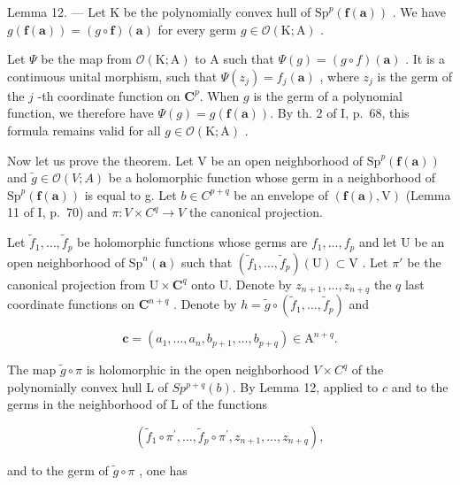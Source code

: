 Lemma 12. --- Let K be the polynomially convex hull of \(\mathrm{Sp}^p (\pmb {f}(\pmb {a}))\) . We have \(g(\pmb {f}(\pmb {a})) = (g\circ \pmb {f})(\pmb {a})\) for every germ \(g\in \mathcal{O}(\mathrm{K};\mathrm{A})\) .

Let \(\Psi\) be the map from \(\mathcal{O}(\mathrm{K};\mathrm{A})\) to A such that \(\Psi(g) = (g\circ f)(\boldsymbol{a})\) . It is a continuous unital morphism, such that \(\Psi(z_j) = f_j(\boldsymbol{a})\) , where \(z_{j}\) is the germ of the \(j\) -th coordinate function on \(\mathbf{C}^p\). When \(g\) is the germ of a polynomial function, we therefore have \(\Psi(g) = g(\boldsymbol{f}(\boldsymbol{a}))\). By th. 2 of I, p.~68, this formula remains valid for all \(g\in \mathcal{O}(\mathrm{K};\mathrm{A})\) .

Now let us prove the theorem. Let V be an open neighborhood of \(\mathrm{Sp}^{p}(\boldsymbol{f}(\boldsymbol{a}))\) and \(\widetilde{g}\in\mathcal{O}(V;A)\) be a holomorphic function whose germ in a neighborhood of \(\mathrm{Sp}^{p}(\boldsymbol{f}(\boldsymbol{a}))\) is equal to g. Let \(b\in C^{p+q}\) be an envelope of \((\boldsymbol{f}(\boldsymbol{a}),\mathrm{V})\) (Lemma 11 of I, p.~70) and \(\pi\colon V\times C^{q}\to V\) the canonical projection.

Let \(\widetilde{f}_1, \ldots, \widetilde{f}_p\) be holomorphic functions whose germs are \(f_1, \ldots, f_p\) and let U be an open neighborhood of \(\mathrm{Sp}^n(\boldsymbol{a})\) such that \((\widetilde{f}_1, \ldots, \widetilde{f}_p)(\mathrm{U}) \subset \mathrm{V}\) . Let \(\pi'\) be the canonical projection from \(\mathrm{U} \times \mathbf{C}^q\) onto U. Denote by \(z_{n+1}, \ldots, z_{n+q}\) the \(q\) last coordinate functions on \(\mathbf{C}^{n+q}\) . Denote by \(h = \widetilde{g} \circ (\widetilde{f}_1, \ldots, \widetilde{f}_p)\) and

\[
\boldsymbol {c} = (a _ {1}, \dots , a _ {n}, b _ {p + 1}, \dots , b _ {p + q}) \in \mathrm{A} ^ {n + q}.
\]

The map \(\widetilde{g} \circ \pi\) is holomorphic in the open neighborhood \(V \times C^q\) of the polynomially convex hull L of \(Sp^{p+q}(b)\). By Lemma 12, applied to \(c\) and to the germs in the neighborhood of L of the functions

\[
(\widetilde {f} _ {1} \circ \pi^ {\prime}, \ldots , \widetilde {f} _ {p} \circ \pi^ {\prime}, z _ {n + 1}, \ldots , z _ {n + q}),
\]

and to the germ of \(\widetilde{g}\circ\pi\) , one has

